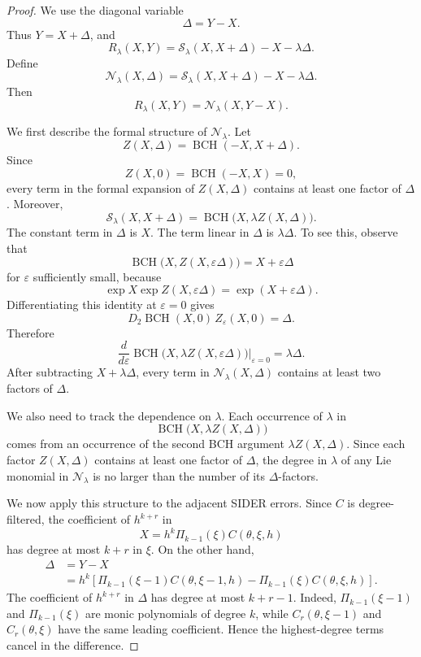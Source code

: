 \documentclass[10pt,a4paper]{amsart}
\newcommand{\BCH}{\operatorname{BCH}}
\begin{document}
\begin{proof}
We use the diagonal variable
\[
        \Delta=Y-X.
\]
Thus \(Y=X+\Delta\), and
\[
        R_\lambda(X,Y)
        =
        \mathcal S_\lambda(X,X+\Delta)-X-\lambda\Delta .
\]
Define
\[
        \mathcal N_\lambda(X,\Delta)
        =
        \mathcal S_\lambda(X,X+\Delta)-X-\lambda\Delta .
\]
Then
\[
        R_\lambda(X,Y)=\mathcal N_\lambda(X,Y-X).
\]

We first describe the formal structure of \(\mathcal N_\lambda\).  Let
\[
        Z(X,\Delta)=\BCH(-X,X+\Delta).
\]
Since
\[
        Z(X,0)=\BCH(-X,X)=0,
\]
every term in the formal expansion of \(Z(X,\Delta)\) contains at least one
factor of \(\Delta\).  Moreover,
\[
        \mathcal S_\lambda(X,X+\Delta)
        =
        \BCH\bigl(X,\lambda Z(X,\Delta)\bigr).
\]
The constant term in \(\Delta\) is \(X\).  The term linear in \(\Delta\) is
\(\lambda\Delta\).  To see this, observe that
\[
        \BCH\bigl(X,Z(X,\varepsilon\Delta)\bigr)
        =
        X+\varepsilon\Delta
\]
for \(\varepsilon\) sufficiently small, because
\[
        \exp X\exp Z(X,\varepsilon\Delta)
        =
        \exp(X+\varepsilon\Delta).
\]
Differentiating this identity at \(\varepsilon=0\) gives
\[
        D_2\BCH(X,0)\,Z_\varepsilon(X,0)=\Delta .
\]
Therefore
\[
        \frac{d}{d\varepsilon}
        \BCH\bigl(X,\lambda Z(X,\varepsilon\Delta)\bigr)
        \bigg|_{\varepsilon=0}
        =
        \lambda\Delta .
\]
After subtracting \(X+\lambda\Delta\), every term in
\(\mathcal N_\lambda(X,\Delta)\) contains at least two factors of
\(\Delta\).

We also need to track the dependence on \(\lambda\).  Each occurrence of
\(\lambda\) in
\[
        \BCH\bigl(X,\lambda Z(X,\Delta)\bigr)
\]
comes from an occurrence of the second BCH argument
\(\lambda Z(X,\Delta)\).  Since each factor \(Z(X,\Delta)\) contains at least
one factor of \(\Delta\), the degree in \(\lambda\) of any Lie monomial in
\(\mathcal N_\lambda\) is no larger than the number of its \(\Delta\)-factors.

We now apply this structure to the adjacent SIDER errors.  Since \(C\) is
degree-filtered, the coefficient of \(h^{k+r}\) in
\[
        X=h^k\Pi_{k-1}(\xi)C(\theta,\xi,h)
\]
has degree at most \(k+r\) in \(\xi\).  On the other hand,
\[
\begin{aligned}
        \Delta
        &=
        Y-X  \\
        &=
        h^k
        \left[
        \Pi_{k-1}(\xi-1)C(\theta,\xi-1,h)
        -
        \Pi_{k-1}(\xi)C(\theta,\xi,h)
        \right].
\end{aligned}
\]
The coefficient of \(h^{k+r}\) in \(\Delta\) has degree at most \(k+r-1\).
Indeed, \(\Pi_{k-1}(\xi-1)\) and \(\Pi_{k-1}(\xi)\) are monic polynomials of
degree \(k\), while \(C_r(\theta,\xi-1)\) and \(C_r(\theta,\xi)\) have the
same leading coefficient.  Hence the highest-degree terms cancel in the
difference.


\end{proof}
\end{document}
